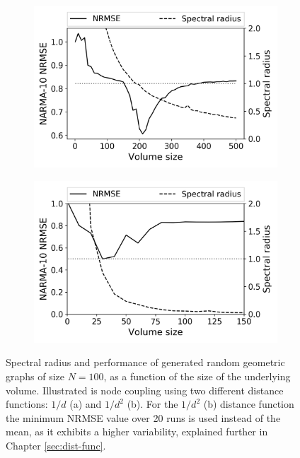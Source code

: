 \begin{figure}[htb]
  \centering
  \begin{subfigure}{.49\textwidth}
    \centering
    \includegraphics[width=1.0\linewidth]{figures/RGG-volume-size-inv.png}
    \caption{}
    \label{fig:size-graph-volume-a}
  \end{subfigure}
  \begin{subfigure}{.49\textwidth}
    \centering
    \includegraphics[width=1.0\linewidth]{figures/RGG-volume-size-inv-squared.png}
    \caption{}
    \label{fig:size-graph-volume-b}
  \end{subfigure}
  \caption{
    Spectral radius and performance of generated random geometric graphs of size
$N = 100$, as a function of the size of the underlying volume. Illustrated is
node coupling using two different distance functions: $1/d$ (a) and $1/d^2$
(b). For the $1/d^2$ (b) distance function the minimum NRMSE value over 20 runs
is used instead of the mean, as it exhibits a higher variability, explained
further in Chapter
\ref{sec:dist-func}.
  }
  \label{fig:size-graph-volume}
\end{figure}

